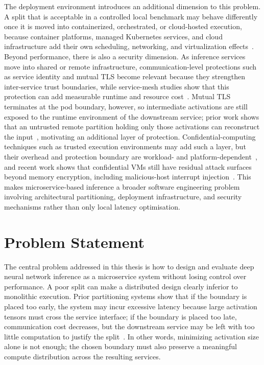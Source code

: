 The deployment environment introduces an additional dimension to this problem. A split that is acceptable in a controlled local benchmark may behave differently once it is moved into containerized, orchestrated, or cloud-hosted execution, because container platforms, managed Kubernetes services, and cloud infrastructure add their own scheduling, networking, and virtualization effects~\cite{managed_k8s_perf,virtualization_costs,cni_k8s_ic2e21}. Beyond performance, there is also a security dimension. As inference services move into shared or remote infrastructure, communication-level protections such as service identity and mutual TLS become relevant because they strengthen inter-service trust boundaries, while service-mesh studies show that this protection can add measurable runtime and resource cost~\cite{meshinsight_socc23,bremlerbarr2025mtls}. Mutual TLS terminates at the pod boundary, however, so intermediate activations are still exposed to the runtime environment of the downstream service; prior work shows that an untrusted remote partition holding only those activations can reconstruct the input~\cite{he2021_attacking_collaborative}, motivating an additional layer of protection. Confidential-computing techniques such as trusted execution environments may add such a layer, but their overhead and protection boundary are workload- and platform-dependent~\cite{guanciale2022_confidential_quartet,mo2024_ml_confidential_computing}, and recent work shows that confidential VMs still have residual attack surfaces beyond memory encryption, including malicious-host interrupt injection~\cite{schluter2024_heckler}. This makes microservice-based inference a broader software engineering problem involving architectural partitioning, deployment infrastructure, and security mechanisms rather than only local latency optimisation.

\section{Problem Statement}
The central problem addressed in this thesis is how to design and evaluate deep neural network inference as a microservice system without losing control over performance. A poor split can make a distributed design clearly inferior to monolithic execution. Prior partitioning systems show that if the boundary is placed too early, the system may incur excessive latency because large activation tensors must cross the service interface; if the boundary is placed too late, communication cost decreases, but the downstream service may be left with too little computation to justify the split~\cite{neurosurgeon,deeperthings,dnnsplit}. In other words, minimizing activation size alone is not enough; the chosen boundary must also preserve a meaningful compute distribution across the resulting services.

